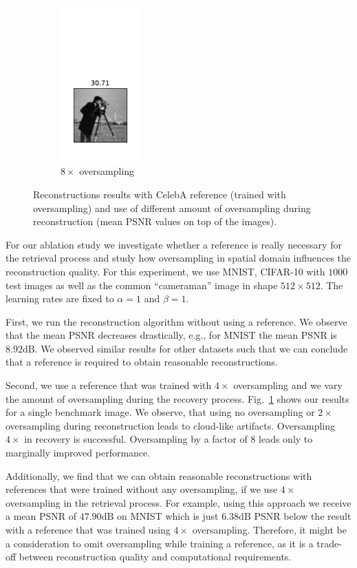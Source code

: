 \begin{figure}
	\begin{subfigure}{.24\textwidth}
		\centering
		\includegraphics[width=3cm, trim= 10 35 10 120]{data/eight-times-oversampling.pdf}
		\caption{$8\times$ oversampling}
	\end{subfigure}
	\caption{Reconstructions results with CelebA reference (trained with oversampling) and use of different amount of oversampling during reconstruction (mean PSNR values on top of the images).}
	\label{oversampling}
\end{figure}

For our ablation study we investigate whether a reference is really
necessary for the retrieval process and study how oversampling
in spatial domain influences the reconstruction quality. For this
experiment, we use MNIST, CIFAR-10 with $1000$ test images as well as
the common ``cameraman'' image in shape $512 \times 512$. The learning rates are fixed to $\alpha=1$ and $\beta=1$.

First, we run the reconstruction algorithm without using a reference. We observe that the mean PSNR decreases drastically, e.g., for MNIST the mean PSNR is $8.92\text{dB}$. We observed similar results for other datasets such that we can conclude that a reference is required to obtain reasonable reconstructions.

Second, we use a reference that was trained with  $4\times$ oversampling and we vary the amount of oversampling during the recovery process. Fig.~\ref{oversampling} shows our results for a single benchmark image. We observe, that using no oversampling or $2\times$ oversampling during reconstruction leads to cloud-like artifacts. Oversampling $4\times$ in recovery is successful. Oversampling by a factor of $8$ leads only to marginally improved performance.

Additionally, we find that we can obtain reasonable reconstructions with references that were trained without any oversampling, if we use $4\times$  oversampling in the retrieval process. For example, using this approach we receive a mean PSNR of $47.90\text{dB}$ on MNIST which is just $6.38 \text{dB}$ PSNR below the result with a reference that was trained using $4 \times$ oversampling. Therefore, it might be a consideration to omit oversampling while training a reference, as it is a trade-off between reconstruction quality and computational requirements.



